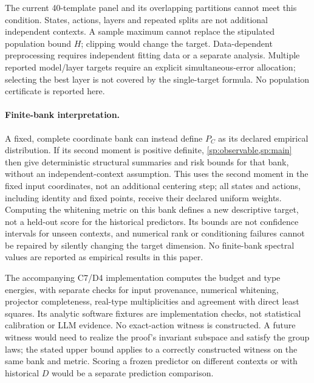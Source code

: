 The current 40-template panel and its overlapping partitions cannot meet this condition. States, actions, layers and repeated splits are not additional independent contexts. A sample maximum cannot replace the stipulated population bound $H$; clipping would change the target. Data-dependent preprocessing requires independent fitting data or a separate analysis. Multiple reported model/layer targets require an explicit simultaneous-error allocation; selecting the best layer is not covered by the single-target formula. No population certificate is reported here.

\paragraph{Finite-bank interpretation.}
\label{sp:finite-bank}
A fixed, complete coordinate bank can instead define $P_C$ as its declared empirical distribution. If its second moment is positive definite, \cref{sp:observable,sp:main} then give deterministic structural summaries and risk bounds for that bank, without an independent-context assumption. This uses the second moment in the fixed input coordinates, not an additional centering step; all states and actions, including identity and fixed points, receive their declared uniform weights. Computing the whitening metric on this bank defines a new descriptive target, not a held-out score for the historical predictors. Its bounds are not confidence intervals for unseen contexts, and numerical rank or conditioning failures cannot be repaired by silently changing the target dimension. No finite-bank spectral values are reported as empirical results in this paper.

The accompanying C7/D4 implementation computes the budget and type energies, with separate checks for input provenance, numerical whitening, projector completeness, real-type multiplicities and agreement with direct least squares. Its analytic software fixtures are implementation checks, not statistical calibration or LLM evidence. No exact-action witness is constructed. A future witness would need to realize the proof's invariant subspace and satisfy the group laws; the stated upper bound applies to a correctly constructed witness on the same bank and metric. Scoring a frozen predictor on different contexts or with historical $D$ would be a separate prediction comparison.
